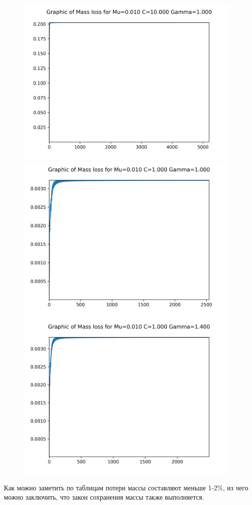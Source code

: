 \begin{figure}[H]
	\centering
	\includegraphics[scale=0.65]{../graphs_data_nonsmooth_2/mass/Graph_mass_mu0.010_C10.000_gamma1.000.png}
	\includegraphics[scale=0.65]{../graphs_data_nonsmooth_2/mass/Graph_mass_mu0.010_C1.000_gamma1.000.png}	
	\includegraphics[scale=0.65]{../graphs_data_nonsmooth_2/mass/Graph_mass_mu0.010_C1.000_gamma1.400.png}
\end{figure}

Как можно заметить по таблицам потери массы составляют меньше 1-2\%, из чего можно заключить, что закон сохранения массы также выполняется. \\


